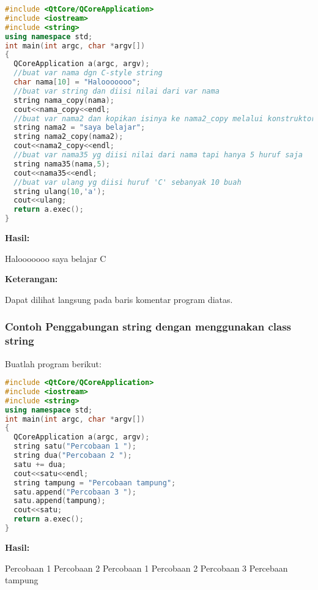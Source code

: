 \begin{lstlisting}[language=c++, caption=Penggunaan class string untuk manipulasi data, label=contoh3-25]
#include <QtCore/QCoreApplication>
#include <iostream>
#include <string>
using namespace std;
int main(int argc, char *argv[])
{
  QCoreApplication a(argc, argv);
  //buat var nama dgn C-style string
  char nama[10] = "Halooooooo";
  //buat var string dan diisi nilai dari var nama
  string nama_copy(nama);
  cout<<nama_copy<<endl;
  //buat var nama2 dan kopikan isinya ke nama2_copy melalui konstruktor
  string nama2 = "saya belajar";
  string nama2_copy(nama2);
  cout<<nama2_copy<<endl;
  //buat var nama35 yg diisi nilai dari nama tapi hanya 5 huruf saja
  string nama35(nama,5);
  cout<<nama35<<endl;
  //buat var ulang yg diisi huruf 'C' sebanyak 10 buah
  string ulang(10,'a');
  cout<<ulang;
  return a.exec();
}
\end{lstlisting}

\textbf{Hasil:}

 \begin{lcverbatim}
 Halooooooo
 saya belajar
 C
 \end{lcverbatim}

\textbf{Keterangan:}

Dapat dilihat langsung pada baris komentar program diatas.

\subsubsection*{Contoh  Penggabungan string dengan menggunakan class string}

Buatlah program berikut:

\begin{lstlisting}[language=c++, caption=Penggabungan string dengan menggunakan class string, label=contoh3-26]
#include <QtCore/QCoreApplication>
#include <iostream>
#include <string>
using namespace std;
int main(int argc, char *argv[])
{
  QCoreApplication a(argc, argv);
  string satu("Percobaan 1 ");
  string dua("Percobaan 2 ");
  satu += dua;
  cout<<satu<<endl;
  string tampung = "Percobaan tampung";
  satu.append("Percobaan 3 ");
  satu.append(tampung);
  cout<<satu;
  return a.exec();
}
\end{lstlisting}

\textbf{Hasil:}
\begin{lcverbatim}
Percobaan 1 	Percobaan 2
Percobaan 1 	Percobaan 2 	Percobaan 3 	Percebaan tampung
\end{lcverbatim}


